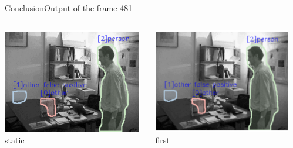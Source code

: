 \documentclass{beamer}
\begin{document}
\begin{frame}{Conclusion}{Output of the frame 481}
    \begin{columns}
        \begin{column}[t]{0.33\textwidth}
            \centering
            \includegraphics[width=\linewidth]{out481_static.PNG}
            static
        \end{column}
        \begin{column}[t]{0.33\textwidth}
            \centering
            \includegraphics[width=\linewidth]{out481_first.PNG}
            first
        \end{column}
        \begin{column}[t]{0.33\textwidth}

\end{column}
\end{columns}
\end{frame}
\end{document}
